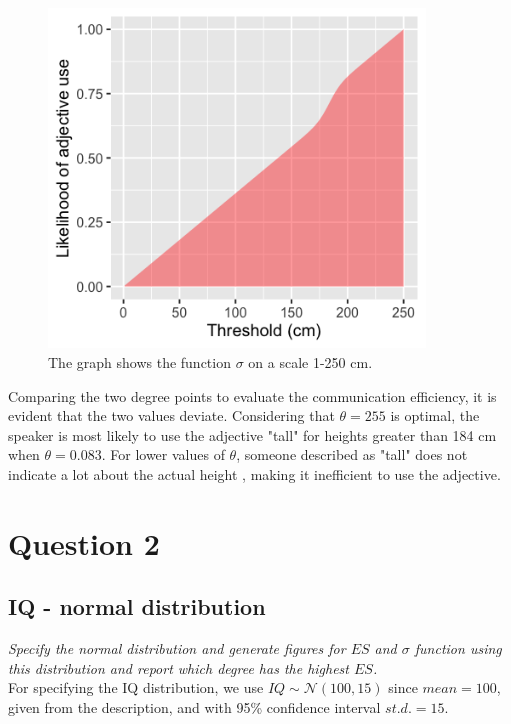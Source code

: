 \documentclass[11pt,a4paper,oneside]{article}
\begin{document}
\begin{figure}[H]
    \centering
    \includegraphics[width=100mm]{figs/Question_1_sigma.png}
    \caption{The graph shows the function $\sigma$ on a scale 1-250 cm.}
  \label{fig:q1_sigma}
\end{figure}

Comparing the two degree points to evaluate the communication efficiency, it is evident that the two values deviate. Considering that $\theta = 255$ is optimal, the speaker is most likely to use the adjective "tall" for heights greater than 184 cm when $\theta = 0.083$. For lower values of $\theta$, someone described as "tall" does not indicate a lot about the actual height , making it inefficient to use the adjective.

\section{Question 2}
\label{Q2}
\subsection{IQ - normal distribution}
\textit{Specify the normal distribution and generate figures for $ES$ and $\sigma$ function using this distribution and report which degree has the highest $ES$.}\\

For specifying the IQ distribution, we use $IQ \sim \mathcal{N}(100, 15)$ since $mean = 100$, given from the description, and with 95\% confidence interval $st.d. = 15$. 
\end{document}
